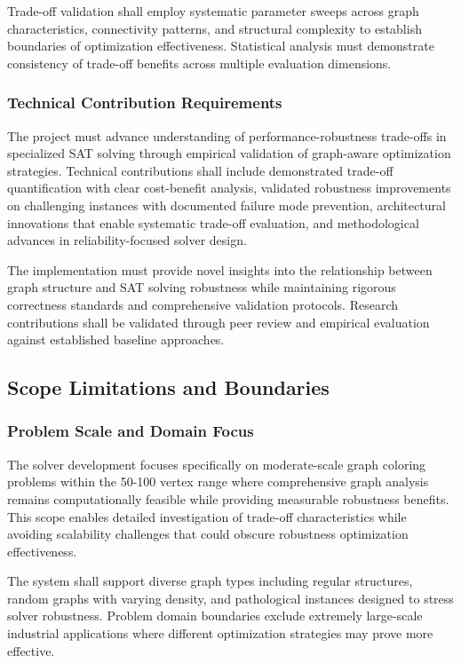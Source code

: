 Trade-off validation shall employ systematic parameter sweeps across graph characteristics, connectivity patterns, and structural complexity to establish boundaries of optimization effectiveness. Statistical analysis must demonstrate consistency of trade-off benefits across multiple evaluation dimensions.

\subsubsection{Technical Contribution Requirements}
The project must advance understanding of performance-robustness trade-offs in specialized SAT solving through empirical validation of graph-aware optimization strategies. Technical contributions shall include demonstrated trade-off quantification with clear cost-benefit analysis, validated robustness improvements on challenging instances with documented failure mode prevention, architectural innovations that enable systematic trade-off evaluation, and methodological advances in reliability-focused solver design.

The implementation must provide novel insights into the relationship between graph structure and SAT solving robustness while maintaining rigorous correctness standards and comprehensive validation protocols. Research contributions shall be validated through peer review and empirical evaluation against established baseline approaches.

\subsection{Scope Limitations and Boundaries}

\subsubsection{Problem Scale and Domain Focus}
The solver development focuses specifically on moderate-scale graph coloring problems within the 50-100 vertex range where comprehensive graph analysis remains computationally feasible while providing measurable robustness benefits. This scope enables detailed investigation of trade-off characteristics while avoiding scalability challenges that could obscure robustness optimization effectiveness.

The system shall support diverse graph types including regular structures, random graphs with varying density, and pathological instances designed to stress solver robustness. Problem domain boundaries exclude extremely large-scale industrial applications where different optimization strategies may prove more effective.

